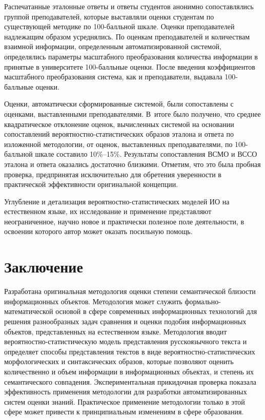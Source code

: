 \begin{multicols}{2}
   Распечатанные эталонные ответы и ответы студентов анонимно 
сопоставлялись группой преподавателей, которые выставляли оценки 
студентам по существующей методике по 100-балль\-ной шкале. Оценки 
преподавателей надлежащим образом усреднялись. По оценкам 
преподавателей и количествам взаимной информации, определенным 
автоматизированной системой, определялись параметры масштабного 
преобразования количества информации в принятые в университете 
   100-балль\-ные оценки. После введения коэффициентов масштабного 
преобразования система, как и преподаватели, выдавала 100-балль\-ные 
оценки. 
   
   Оценки, автоматически сформированные сис\-те\-мой, были сопоставлены с 
оценками, вы\-став\-лен\-ны\-ми преподавателями. В~итоге было получено, что 
среднее квадратическое отклонение оценок, вычисленных системой на 
основании сопоставлений вероятностно-статистических образов эталона и 
ответа по изложенной методологии, от оценок, выставленных 
преподавателями, по 100-балль\-ной шкале составило 10\%--15\%. 
Результаты со\-по\-став\-ле\-ния ВСМО и ВССО эталона и ответа оказались 
достаточно близкими. Отметим, что это была пробная проверка, 
предпринятая исключительно для обретения уверенности в практической 
эффективности оригинальной концепции.
   
   Углубление и детализация вероятностно-ста\-ти\-сти\-че\-ских моделей ИО на 
естественном языке, их исследование и применение представляют 
неограниченное, научно новое и практически полезное поле деятельности, в 
освоении которого автор может оказать посильную помощь. 

\vspace*{-6pt}
   
\section{Заключение}

\vspace*{-2pt}

   Разработана оригинальная методология оценки степени семантической 
близости инфор\-ма\-ционных объектов. Методология может служить 
   фор\-маль\-но-ма\-те\-ма\-ти\-че\-ской основой в сфере современных 
информационных технологий для решения разнообразных задач сравнения и 
оценки подобия информационных объектов, представленных на 
естественном языке. Методология вводит ве\-ро\-ят\-но\-ст\-но-ста\-ти\-сти\-че\-скую 
модель представления русскоязычного текста и определяет способы 
представления текстов в виде ве\-ро\-ят\-но\-ст\-но-ста\-ти\-сти\-че\-ских 
морфологических и синтаксических образов, которые позволяют оценить 
количественно и объем информации в информационных объектах, и степень 
их семантического совпадения. Экспериментальная прикидочная проверка 
показала эффективность применения методологии для разработки 
автоматизированных систем оценки знаний. Практическое применение 
методологии только в этой сфере может привести к принципиальным 
изменениям в сфере образования. 


\end{multicols}
